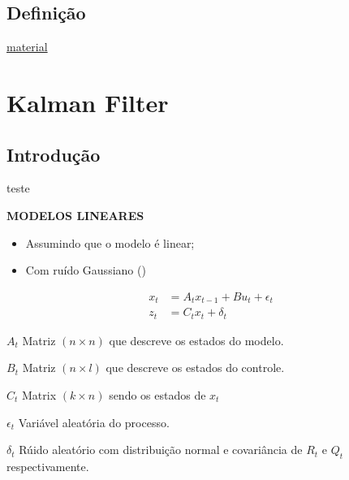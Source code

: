 \documentclass[t]{beamer}
\newcommand{\titleSlide}[1]{\textbf{\MakeUppercase{#1}}}
\begin{document}
\subsection{Definição}
\begin{frame}
  \href{http://www.joinville.ifsc.edu.br/~michael.klug/ROB74/Aulas/aula2_trans_geometricas.pdf
  }{material}
\end{frame}


\section{Kalman Filter}
\subsection{Introdução}
\begin{frame}
  teste
\end{frame}
\begin{frame}
  \titleSlide{Modelos Lineares}
 
  \begin{itemize}
    \item Assumindo que o modelo é linear;
    \item Com ruído Gaussiano ()
  \end{itemize}

  \begin{align} 
    x_t &= A_t x_{t-1} + B u_t + \epsilon_t\\ 
    z_t &= C_t x_t + \delta_t
    \end{align}

    $A_t$ Matriz $(n \times n)$ que descreve os estados do modelo.

    $B_t$ Matriz $(n \times l)$ que descreve os estados do controle.

    $C_t$ Matrix $(k\times n)$ sendo os estados de $x_t$

    $\epsilon_t$ Variável aleatória do processo.

    $\delta_t$ Rúido aleatório com distribuição normal e covariância de $R_t$ e $Q_t$ respectivamente.

\end{frame}
\end{document}
